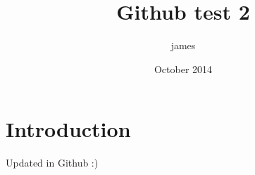 \documentclass{article}
\title{Github test 2}
\author{james }
\date{October 2014}
\begin{document}
\maketitle

\section{Introduction}

Updated in Github :)
\end{document}

